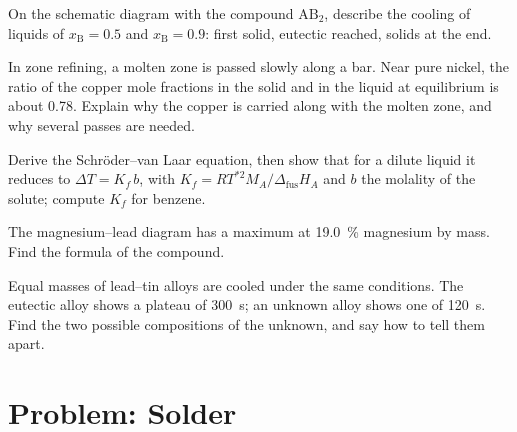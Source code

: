 \begin{exercise}[$\star\star$]\label{exo:b2:solid-liquid-diagrams:8}
On the schematic diagram with the compound $\mathrm{AB_2}$, describe the
cooling of liquids of $x_{\mathrm B} = 0.5$ and $x_{\mathrm B} = 0.9$: first
solid, eutectic reached, solids at the end.
\end{exercise}

\begin{exercise}[$\star\star$]\label{exo:b2:solid-liquid-diagrams:9}
In zone refining, a molten zone is passed slowly along a bar. Near pure nickel,
the ratio of the copper mole fractions in the solid and in the liquid at
equilibrium is about 0.78. Explain why the copper is carried along with the
molten zone, and why several passes are needed.
\end{exercise}

\begin{exercise}[$\star\star\star$]\label{exo:b2:solid-liquid-diagrams:10}
Derive the Schr\"oder--van Laar equation, then show that for a dilute liquid
it reduces to $\Delta T = K_f\,b$, with $K_f = RT^{*2}M_A/\Delta_{\text{fus}}H_A$
and $b$ the molality of the solute; compute $K_f$ for benzene.
\end{exercise}

\begin{exercise}[$\star\star\star$]\label{exo:b2:solid-liquid-diagrams:11}
The magnesium--lead diagram has a  maximum at 19.0~\% magnesium by
mass. Find the formula of the compound.
\end{exercise}

\begin{exercise}[$\star\star\star$]\label{exo:b2:solid-liquid-diagrams:12}
Equal masses of lead--tin alloys are cooled under the same conditions. The
eutectic alloy shows a plateau of \qty{300}{s}; an unknown alloy shows one of
\qty{120}{s}. Find the two possible compositions of the unknown, and say how to
tell them apart.
\end{exercise}

\section{Problem: Solder}

